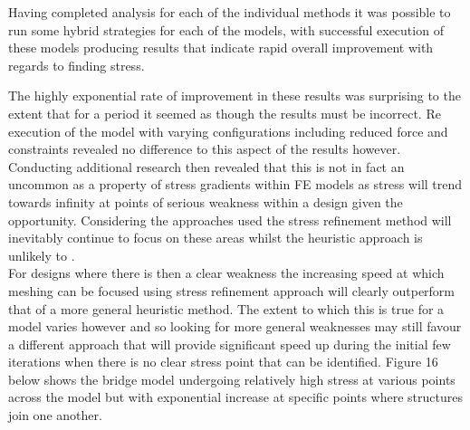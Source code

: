 \noindent
Having completed analysis for each of the individual methods it was possible to run some hybrid strategies for each of the models, with successful execution of these models producing results that indicate rapid overall improvement with regards to finding stress. 


\noindent
The highly exponential rate of improvement in these results was surprising to the extent that for a period it seemed as though the results must be incorrect. Re execution of the model with varying configurations including reduced force and constraints revealed no difference to this aspect of the results however. Conducting additional research then revealed that this is not in fact an uncommon as a property of stress gradients within FE models as stress will trend towards infinity at points of serious weakness within a design given the opportunity. Considering the approaches used the stress refinement method will inevitably continue to focus on these areas whilst the heuristic approach is unlikely to \cite{StressConcerntration}.  \\

\noindent
For designs where there is then a clear weakness the increasing speed at which meshing can be focused using stress refinement approach will clearly outperform that of a more general heuristic method. The extent to which this is true for a model varies however and so looking for more general weaknesses may still favour a different approach that will provide significant speed up during the initial few iterations when there is no clear stress point that can be identified. Figure 16 below shows the bridge model undergoing relatively high stress at various points across the model but with exponential increase at specific points where structures join one another. \\ 


